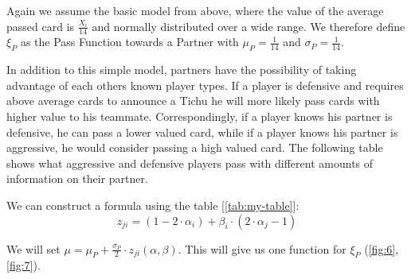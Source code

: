 Again we assume the basic model from above, where the value of the average passed card is $\frac{X_i}{14}$ and normally distributed over a wide range. We therefore define $\xi_P$ as the Pass Function towards a Partner with $\mu_P =\frac{1}{14}$ and $\sigma_P = \frac{1}{14}$.


In addition to this simple model, partners have the possibility of taking advantage of each others known player types. If a player is defensive and requires above average cards to announce a Tichu he will more likely pass cards with higher value to his teammate. Correspondingly, if a player knows his partner is defensive, he can pass a lower valued card, while if a player knows his partner is aggressive, he would consider passing a high valued card. The following table shows what aggressive and defensive players pass with different amounts of information on their partner. \\
\begin{table}[h]
\centering
\caption*{$P_R$ - Player receiving, $P_P$ - Player passing} 
\label{tab:my-table}
\end{table}
We can construct a formula using the table [\ref{tab:my-table}]: 
\begin{equation*}
z_{ji} = (1 - 2\cdot\alpha_i) + \beta_i \cdot (2\cdot\alpha_j - 1)
\end{equation*}

We will set $\mu = \mu_P + \frac{\sigma_P}{2} \cdot z_{ji}(\alpha, \beta)$. This will give us one function for $\xi_P$ (\ref{fig:6},\ref{fig:7}).

